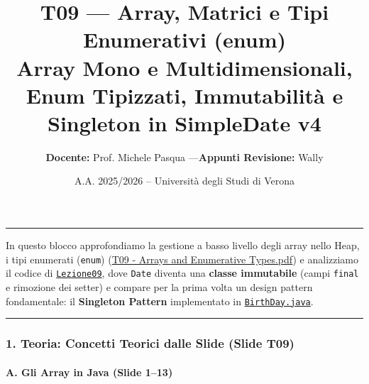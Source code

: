 \documentclass[11pt,a4paper]{article}
\title{\Huge\bfseries\sffamily\color{brandblue} T09 --- Array, Matrici e Tipi Enumerativi (enum) \\[0.3em] \large\sffamily Array Mono e Multidimensionali, Enum Tipizzati, Immutabilità e Singleton in SimpleDate v4}
\author{\textbf{Docente:} Prof. Michele Pasqua \quad---\quad \textbf{Appunti Revisione:} Wally}
\date{A.A. 2025/2026 -- Universit\`a degli Studi di Verona}
\newcommand{\passthrough}[1]{#1}
\begin{document}
\maketitle
\thispagestyle{fancy}
\vspace{-1.2em}
\noindent\textcolor{brandblue}{\rule{\textwidth}{0.8pt}}
\vspace{1.2em}

In questo blocco approfondiamo la gestione a basso livello degli array
nello Heap, i tipi enumerati (\passthrough{\lstinline!enum!})
(\href{file:///home/wally/Documenti/GitHub/Programmazione-II/25-26/Teoria-e-Esercitazioni/Slides-20260902/T09\%20-\%20Arrays\%20and\%20Enumerative\%20Types.pdf}{T09
- Arrays and Enumerative Types.pdf}) e analizziamo il codice di
\href{file:///home/wally/Documenti/GitHub/Programmazione-II/25-26/Teoria-e-Esercitazioni/Codice-20260902/Lezione09/SimpleDate/src}{\passthrough{\lstinline!Lezione09!}},
dove \passthrough{\lstinline!Date!} diventa una \textbf{classe
immutabile} (campi \passthrough{\lstinline!final!} e rimozione dei
setter) e compare per la prima volta un design pattern fondamentale: il
\textbf{Singleton Pattern} implementato in
\href{file:///home/wally/Documenti/GitHub/Programmazione-II/25-26/Teoria-e-Esercitazioni/Codice-20260902/Lezione09/SimpleDate/src/BirthDay.java}{\passthrough{\lstinline!BirthDay.java!}}.

\begin{center}\rule{0.5\linewidth}{0.5pt}\end{center}

\subsubsection{1. Teoria: Concetti Teorici dalle Slide (Slide
T09)}\label{teoria-concetti-teorici-dalle-slide-slide-t09}

\paragraph{A. Gli Array in Java (Slide
1--13)}\label{a.-gli-array-in-java-slide-113}
\end{document}
